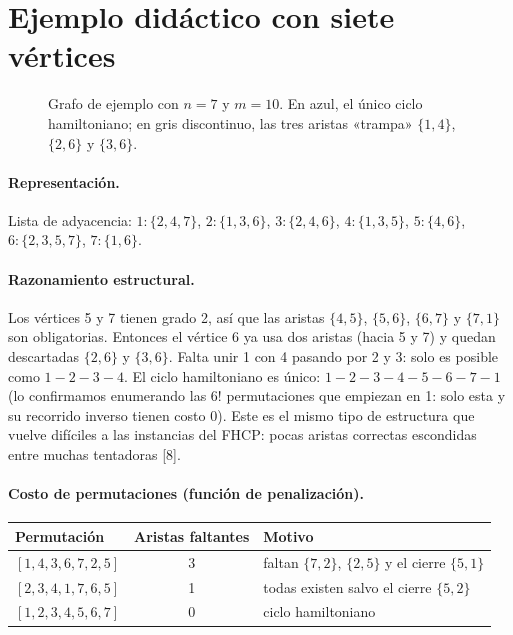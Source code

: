 \documentclass[11pt,letterpaper]{article}
\theoremstyle{definition}
\begin{document}
\section{Ejemplo didáctico con siete vértices}

\begin{figure}[h]
\centering
{}
\caption{Grafo de ejemplo con $n=7$ y $m=10$. En azul, el único ciclo hamiltoniano; en
gris discontinuo, las tres aristas «trampa» $\{1,4\}$, $\{2,6\}$ y $\{3,6\}$.}
\label{fig:ejemplo}
\end{figure}

\paragraph{Representación.} Lista de adyacencia:
$1\!:\!\{2,4,7\}$, $2\!:\!\{1,3,6\}$, $3\!:\!\{2,4,6\}$, $4\!:\!\{1,3,5\}$, $5\!:\!\{4,6\}$,
$6\!:\!\{2,3,5,7\}$, $7\!:\!\{1,6\}$.

\paragraph{Razonamiento estructural.} Los vértices 5 y 7 tienen grado 2, así que las aristas
$\{4,5\}$, $\{5,6\}$, $\{6,7\}$ y $\{7,1\}$ son obligatorias. Entonces el vértice 6 ya usa dos aristas
(hacia 5 y 7) y quedan descartadas $\{2,6\}$ y $\{3,6\}$. Falta unir 1 con 4 pasando por 2 y
3: solo es posible como $1\!-\!2\!-\!3\!-\!4$. El ciclo hamiltoniano es único:
$1\!-\!2\!-\!3\!-\!4\!-\!5\!-\!6\!-\!7\!-\!1$ (lo confirmamos enumerando las $6!$
permutaciones que empiezan en 1: solo esta y su recorrido inverso tienen costo 0). Este es
el mismo tipo de estructura que vuelve difíciles a las instancias del FHCP: pocas aristas
correctas escondidas entre muchas tentadoras [8].

\paragraph{Costo de permutaciones (función de penalización).}
\begin{center}
\begin{tabular}{@{}lcl@{}}
\toprule
Permutación & Aristas faltantes & Motivo \\
\midrule
$[1,4,3,6,7,2,5]$ & 3 & faltan $\{7,2\}$, $\{2,5\}$ y el cierre $\{5,1\}$ \\
$[2,3,4,1,7,6,5]$ & 1 & todas existen salvo el cierre $\{5,2\}$ \\
$[1,2,3,4,5,6,7]$ & 0 & ciclo hamiltoniano \\
\bottomrule
\end{tabular}
\end{center}
\end{document}
